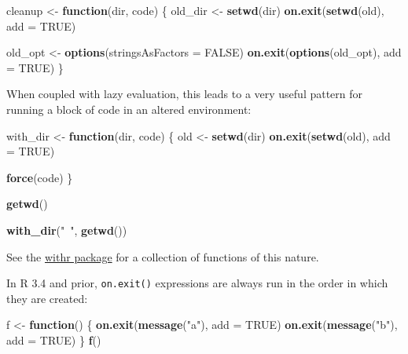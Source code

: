 \documentclass[]{book}
\newenvironment{Shaded}{\begin{snugshade}}{\end{snugshade}}
\newcommand{\ControlFlowTok}[1]{\textcolor[rgb]{0.13,0.29,0.53}{\textbf{#1}}}
\newcommand{\DataTypeTok}[1]{\textcolor[rgb]{0.13,0.29,0.53}{#1}}
\newcommand{\KeywordTok}[1]{\textcolor[rgb]{0.13,0.29,0.53}{\textbf{#1}}}
\newcommand{\NormalTok}[1]{#1}
\newcommand{\OtherTok}[1]{\textcolor[rgb]{0.56,0.35,0.01}{#1}}
\newcommand{\StringTok}[1]{\textcolor[rgb]{0.31,0.60,0.02}{#1}}
\theoremstyle{definition}
\theoremstyle{definition}
\theoremstyle{definition}
\theoremstyle{remark}
\begin{document}
\begin{Shaded}
\begin{Highlighting}[]
\NormalTok{cleanup <-}\StringTok{ }\ControlFlowTok{function}\NormalTok{(dir, code) \{}
\NormalTok{  old_dir <-}\StringTok{ }\KeywordTok{setwd}\NormalTok{(dir)}
  \KeywordTok{on.exit}\NormalTok{(}\KeywordTok{setwd}\NormalTok{(old), }\DataTypeTok{add =} \OtherTok{TRUE}\NormalTok{)}
  
\NormalTok{  old_opt <-}\StringTok{ }\KeywordTok{options}\NormalTok{(}\DataTypeTok{stringsAsFactors =} \OtherTok{FALSE}\NormalTok{)}
  \KeywordTok{on.exit}\NormalTok{(}\KeywordTok{options}\NormalTok{(old_opt), }\DataTypeTok{add =} \OtherTok{TRUE}\NormalTok{)}
\NormalTok{\}}
\end{Highlighting}
\end{Shaded}

When coupled with lazy evaluation, this leads to a very useful pattern
for running a block of code in an altered environment:

\begin{Shaded}
\begin{Highlighting}[]
\NormalTok{with_dir <-}\StringTok{ }\ControlFlowTok{function}\NormalTok{(dir, code) \{}
\NormalTok{  old <-}\StringTok{ }\KeywordTok{setwd}\NormalTok{(dir)}
  \KeywordTok{on.exit}\NormalTok{(}\KeywordTok{setwd}\NormalTok{(old), }\DataTypeTok{add =} \OtherTok{TRUE}\NormalTok{)}

  \KeywordTok{force}\NormalTok{(code)}
\NormalTok{\}}

\KeywordTok{getwd}\NormalTok{()}
\end{Highlighting}
\end{Shaded}

\begin{Shaded}
\begin{Highlighting}[]
\KeywordTok{with_dir}\NormalTok{(}\StringTok{"~"}\NormalTok{, }\KeywordTok{getwd}\NormalTok{())}
\end{Highlighting}
\end{Shaded}

See the \href{http://withr.r-lib.org}{withr package} for a collection of
functions of this nature.

In R 3.4 and prior, \texttt{on.exit()} expressions are always run in the
order in which they are created:

\begin{Shaded}
\begin{Highlighting}[]
\NormalTok{f <-}\StringTok{ }\ControlFlowTok{function}\NormalTok{() \{}
  \KeywordTok{on.exit}\NormalTok{(}\KeywordTok{message}\NormalTok{(}\StringTok{"a"}\NormalTok{), }\DataTypeTok{add =} \OtherTok{TRUE}\NormalTok{)}
  \KeywordTok{on.exit}\NormalTok{(}\KeywordTok{message}\NormalTok{(}\StringTok{"b"}\NormalTok{), }\DataTypeTok{add =} \OtherTok{TRUE}\NormalTok{)}
\NormalTok{\}}
\KeywordTok{f}\NormalTok{()}
\end{Highlighting}
\end{Shaded}
\end{document}
